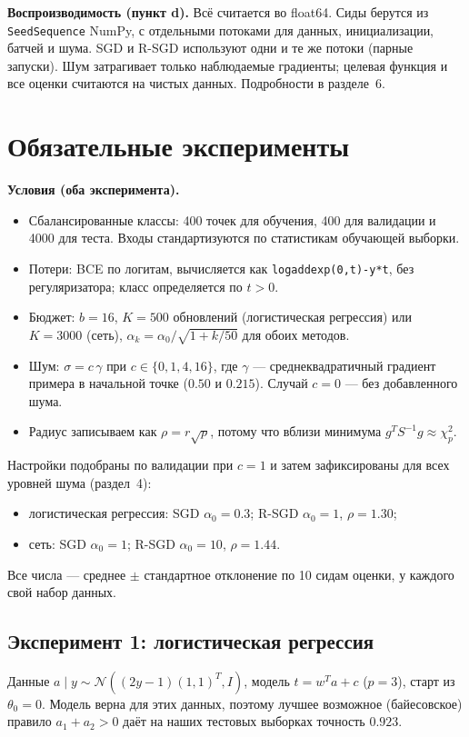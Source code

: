 \documentclass[11pt,a4paper]{article}
\begin{document}
\textbf{Воспроизводимость (пункт d).} Всё считается во float64. Сиды берутся из \texttt{SeedSequence}
NumPy, с отдельными потоками для данных, инициализации, батчей и шума. SGD и R-SGD используют одни и
те же потоки (парные запуски). Шум затрагивает только наблюдаемые градиенты; целевая функция и все
оценки считаются на чистых данных. Подробности в разделе~6.

\section{Обязательные эксперименты}

\textbf{Условия (оба эксперимента).}
\begin{itemize}
\item Сбалансированные классы: 400 точек для обучения, 400 для валидации и 4000 для теста. Входы
стандартизуются по статистикам обучающей выборки.
\item Потери: BCE по логитам, вычисляется как \texttt{logaddexp(0,t)-y*t}, без регуляризатора;
класс определяется по $t>0$.
\item Бюджет: $b=16$, $K=500$ обновлений (логистическая регрессия) или $K=3000$ (сеть),
$\alpha_k=\alpha_0/\sqrt{1+k/50}$ для обоих методов.
\item Шум: $\sigma=c\,\gamma$ при $c\in\{0,1,4,16\}$, где $\gamma$ — среднеквадратичный градиент
примера в начальной точке ($0.50$ и $0.215$). Случай $c=0$ — без добавленного шума.
\item Радиус записываем как $\rho=r\sqrt p$, потому что вблизи минимума $g^TS^{-1}g\approx\chi^2_p$.
\end{itemize}

Настройки подобраны по валидации при $c=1$ и затем зафиксированы для всех уровней шума (раздел~4):
\begin{itemize}
\item логистическая регрессия: SGD $\alpha_0=0.3$; R-SGD $\alpha_0=1$, $\rho=1.30$;
\item сеть: SGD $\alpha_0=1$; R-SGD $\alpha_0=10$, $\rho=1.44$.
\end{itemize}
Все числа — среднее $\pm$ стандартное отклонение по 10 сидам оценки, у каждого свой набор данных.

\subsection{Эксперимент 1: логистическая регрессия}

Данные $a\mid y\sim\mathcal N((2y-1)(1,1)^T,I)$, модель $t=w^Ta+c$ ($p=3$), старт из
$\theta_0=0$. Модель верна для этих данных, поэтому лучшее возможное (байесовское) правило
$a_1+a_2>0$ даёт на наших тестовых выборках точность $0.923$.
\end{document}
